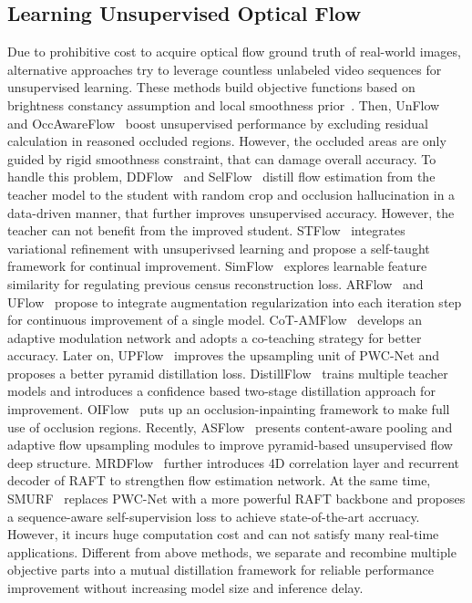 \documentclass[lettersize,journal]{IEEEtran}
\begin{document}
\subsection{Learning Unsupervised Optical Flow}
Due to prohibitive cost to acquire optical flow ground truth of real-world images, alternative approaches try to leverage countless unlabeled video sequences for unsupervised learning. These methods build objective functions based on brightness constancy assumption and local smoothness prior~\cite{10.1007/978-3-319-49409-8_1,10.5555/3298239.3298457}. Then, UnFlow~\cite{Meister:2018:UUL} and OccAwareFlow~\cite{8578611} boost unsupervised performance by excluding residual calculation in reasoned occluded regions. However, the occluded areas are only guided by rigid smoothness constraint, that can damage overall accuracy. To handle this problem, DDFlow~\cite{Liu:2019:DDFlow} and SelFlow~\cite{Liu:2019:SelFlow} distill flow estimation from the teacher model to the student with random crop and occlusion hallucination in a data-driven manner, that further improves unsupervised accuracy. However, the teacher can not benefit from the improved student. STFlow~\cite{9201360} integrates variational refinement with unsuperivsed learning and propose a self-taught framework for continual improvement. SimFlow~\cite{10.1007/978-3-030-58586-0_11} explores learnable feature similarity for regulating previous census reconstruction loss. ARFlow~\cite{Liu_2020_CVPR} and UFlow~\cite{10.1007/978-3-030-58536-5_33} propose to integrate augmentation regularization into each iteration step for continuous improvement of a single model. CoT-AMFlow~\cite{Wang_CoRL_2020} develops an adaptive modulation network and adopts a co-teaching strategy for better accuracy. Later on, UPFlow~\cite{Luo_2021_CVPR} improves the upsampling unit of PWC-Net and proposes a better pyramid distillation loss. DistillFlow~\cite{9444870} trains multiple teacher models and introduces a confidence based two-stage distillation approach for improvement. OIFlow~\cite{9477059} puts up an occlusion-inpainting framework to make full use of occlusion regions. Recently, ASFlow~\cite{9625946} presents content-aware pooling and adaptive flow upsampling modules to improve pyramid-based unsupervised flow deep structure. MRDFlow~\cite{9648363} further introduces 4D correlation layer and recurrent decoder of RAFT to strengthen flow estimation network. At the same time, SMURF~\cite{Stone_2021_CVPR} replaces PWC-Net with a more powerful RAFT backbone and proposes a sequence-aware self-supervision loss to achieve state-of-the-art accruacy. However, it incurs huge computation cost and can not satisfy many real-time applications. Different from above methods, we separate and recombine multiple objective parts into a mutual distillation framework for reliable performance improvement without increasing model size and inference delay.
\end{document}
